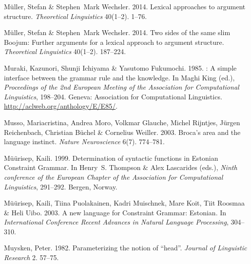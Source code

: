 \begin{thebibliography}{1420}
M{\"u}ller, Stefan \& Stephen~Mark Wechsler. 2014{}.
\newblock Lexical approaches to argument structure.
\newblock \emph{Theoretical Linguistics} 40(1--2). 1--76.

M{\"u}ller, Stefan \& Stephen~Mark Wechsler. 2014{}.
\newblock Two sides of the same slim {Boojum}: {Further} arguments for a
  lexical approach to argument structure.
\newblock \emph{Theoretical Linguistics} 40(1--2). 187--224.

Muraki, Kazunori, Shunji Ichiyama \& Yasutomo Fukumochi. 1985.
: {A} simple interface between the
  grammar rule and the knowledge.
\newblock In Maghi King (ed.), \emph{Proceedings of the 2nd {European Meeting
  of the Association for Computational Linguistics}}, 198--204. Geneva:
  Association for Computational Linguistics.
\newblock \urlprefix\url{http://aclweb.org/anthology/E/E85/}.

Musso, Mariacristina, Andrea Moro, Volkmar Glauche, Michel Rijntjes, J{\"u}rgen
  Reichenbach, Christian B{\"u}chel \& Cornelius Weiller. 2003.
\newblock Broca's area and the language instinct.
\newblock \emph{Nature Neuroscience} 6(7). 774--781.

M{\"u}{\"u}risep, Kaili. 1999.
\newblock Determination of syntactic functions in {Estonian} {Constraint
  Grammar}.
\newblock In Henry~S. Thompson \& Alex Lascarides (eds.), \emph{Ninth
  conference of the {European Chapter of the Association for Computational
  Linguistics}}, 291--292. Bergen, Norway.

M{\"u}{\"u}risep, Kaili, Tiina Puolakainen, Kadri Muischnek, Mare Koit, Tiit
  Roosmaa \& Heli Uibo. 2003.
\newblock A new language for {Constraint Grammar}: {Estonian}.
\newblock In \emph{International {Conference Recent Advances in Natural
  Language Processing}}, 304--310.

Muysken, Peter. 1982.
\newblock Parameterizing the notion of ``head''.
\newblock \emph{Journal of Linguistic Research} 2. 57--75.


\end{thebibliography}
